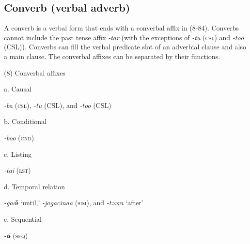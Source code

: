 \subsection{Converb (verbal adverb)}

A converb is a verbal form that ends with a converbal affix in (8-84). Converbs cannot include the past tense affix \textit{{}-tar} (with the exceptions of \textit{{}-tu} (\textsc{csl}) and \textit{{}-too} (CSL)). Converbs can fill the verbal predicate slot of an adverbial clause and also a main clause. The converbal affixes can be separated by their functions.

(8)  Converbal affixes

  a.  Causal

    \textit{{}-ba} (\textsc{csl}), \textit{{}-tu} (CSL), and \textit{{}-too} (CSL)

  b.  Conditional

    \textit{{}-boo} (\textsc{cnd})

  c.  Listing

    \textit{{}-tai} (\textsc{lst})

  d.  Temporal relation

    \textit{{}-gadɨ} ‘until,’ \textit{{}-jagacinaa} (\textsc{sim}), and \textit{{}-təəra} ‘after’

  e.  Sequential

    \textit{{}-tɨ} (\textsc{seq})

